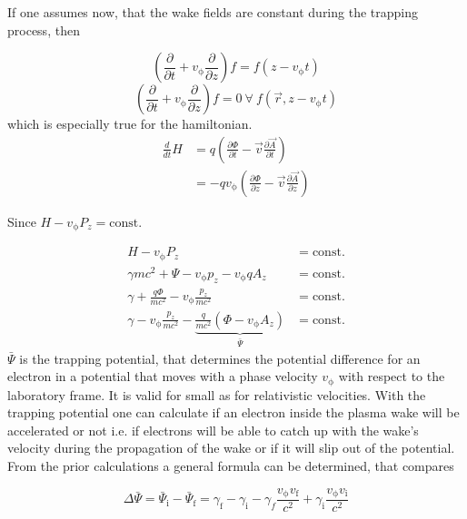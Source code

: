 If one assumes now, that the wake fields are constant during the trapping process, then 

\begin{equation}
(\frac{\partial}{\partial t}+v_\mathrm{\phi} \frac{\partial}{\partial z} ) f =   f ( z-v_\mathrm{\phi} t)
\end{equation}\begin{equation}
(\frac{\partial}{\partial t}+v_\mathrm{\phi} \frac{\partial}{\partial z} ) f =0 \ \forall \   f (\vec{r}, z-v_\mathrm{\phi} t)
\end{equation}
which is especially true for the hamiltonian.
\begin{align*}
\frac{d}{dt}H&=q(\frac{\partial \Phi}{\partial t}-\vec{v}\frac{\partial \vec{A}}{\partial t})\\
&=-q v_\mathrm{\phi}(\frac{\partial \Phi}{\partial z}-\vec{v} \frac{\partial \vec{A}}{\partial z}) 
\end{align*}

Since $H-v_\mathrm{\phi}P_z=\mathrm{const.}$

\begin{align}
H-v_\mathrm{\phi}P_z &= \mathrm{const.}\\
\gamma m c^2+\Psi-v_\mathrm{\phi}p_z-v_\mathrm{\phi}qA_z &= \mathrm{const.}\\
\gamma+\frac{q \Phi}{m c^2}-v_\mathrm{\phi} \frac{p_z}{mc^2} &= \mathrm{const.}\\
\gamma - v_\mathrm{\phi} \frac{p_z}{mc^2}- \underbrace{\frac{q}{mc^2}(\Phi-v_\mathrm{\phi}A_z)}_{\bar{\Psi}}  &= \mathrm{const.} 
\end{align}
$\bar{\Psi}$ is the trapping potential, that determines the potential difference for an electron in a potential that moves with a phase velocity $v_\mathrm{\phi}$ with respect to the laboratory frame. It is valid for small as for relativistic velocities.
With the trapping potential one can calculate if an electron inside the plasma wake will be accelerated or not i.e. if electrons will be able to catch up with the wake's velocity during the propagation of the wake or if it will slip out of the potential.
From the prior calculations a general formula can be determined, that compares

\begin{equation}
\label{eqn:Trapping_Potential_Pre}
\Delta \bar{\Psi}= \bar{\Psi}_\mathrm{i}-\bar{\Psi}_\mathrm{f}=\gamma_\mathrm{f}-\gamma_\mathrm{i}-\gamma_f\frac{v_\mathrm{\phi}v_\mathrm{f}}{c^2}+\gamma_\mathrm{i}\frac{v_\mathrm{\phi}v_\mathrm{i}}{c^2} 
\end{equation}

